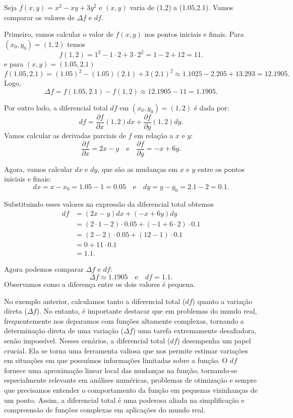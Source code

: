 \begin{example}{}{}
 Seja $f(x,y)=x^2-xy+3y^2$ e $(x,y)$ varia de (1,2) a (1.05,2.1). Vamos comparar os valores de $\Delta f$ e $df$. 

Primeiro, vamos calcular o valor de \(f(x, y)\) nos pontos iniciais e finais. Para \((x_0, y_0) = (1, 2)\) temos
\[f(1, 2) = 1^2 - 1 \cdot 2 + 3 \cdot 2^2 = 1 - 2 + 12 = 11.\]
e para \((x, y) = (1.05, 2.1)\)
\[f(1.05, 2.1) = (1.05)^2 - (1.05)(2.1) + 3(2.1)^2 \approx 1.1025 - 2.205 + 13.293 = 12.1905.\]
Logo, 
\[\Delta f = f(1.05, 2.1) - f(1, 2) \approx 12.1905 - 11 = 1.1905.\]

Por outro lado, a diferencial total \(df\) em $(x_0,y_0)=(1,2)$ é dada por:
\[df = \frac{\partial f}{\partial x}(1,2)dx + \frac{\partial f}{\partial y}(1,2) dy.\]
Vamos calcular as derivadas parciais de \(f\) em relação a \(x\) e \(y\):
\[\frac{\partial f}{\partial x} = 2x - y \quad \text{e} \quad \frac{\partial f}{\partial y} = -x + 6y.\]

Agora, vamos calcular \(dx\) e \(dy\), que são as mudanças em \(x\) e \(y\) entre os pontos iniciais e finais:
\[dx = x-x_0= 1.05 - 1 = 0.05 \quad \text{e} \quad dy = y-y_0=2.1 - 2 = 0.1.\]

Substituindo esses valores na expressão da diferencial total obtemos
\begin{align*}
df & =  (2x - y)dx + (-x + 6y)dy \\
&= (2 \cdot 1 - 2) \cdot 0.05 + (-1 + 6 \cdot 2) \cdot 0.1 \\
&= (2 - 2) \cdot 0.05 + (12 - 1) \cdot 0.1 \\
&= 0 + 11 \cdot 0.1 \\
&= 1.1.
\end{align*}

Agora podemos comparar \(\Delta f\) e \(df\):
\[\Delta f \approx 1.1905 \quad \text{e} \quad df = 1.1.\]
Observamos como a diferença entre os dois valores é pequena. 

\end{example}


No exemplo anterior, calculamos tanto a diferencial total (\(df\)) quanto a variação direta (\(\Delta f\)). No entanto, é importante destacar que em problemas do mundo real, frequentemente nos deparamos com funções altamente complexas, tornando a determinação direta de uma variação (\(\Delta f\)) uma tarefa extremamente desafiadora, senão impossível. Nesses cenários, a diferencial total (\(df\)) desempenha um papel crucial. Ela se torna uma ferramenta valiosa que nos permite estimar variações em situações em que possuímos informações limitadas sobre a função. O \(df\) fornece uma aproximação linear local das mudanças na função, tornando-se especialmente relevante em análises numéricas, problemas de otimização e sempre que precisamos entender o comportamento da função em pequenas vizinhanças de um ponto. Assim, a diferencial total é uma poderosa aliada na simplificação e compreensão de funções complexas em aplicações do mundo real.





